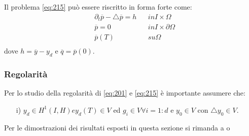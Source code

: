 Il problema \ref{eq:215} può essere riscritto in forma forte come:
\begin{equation}
\begin{aligned}
& {\partial_{t}}\overline{p} -\bigtriangleup\overline{p} = h & & in I{\times}\Omega \\
& \overline{p}=0 & & in I{\times}\partial\Omega \\
& \overline{p}(T) & & su \Omega \\
\label{eq:216}
\end{aligned}
\end{equation}
dove $ h= \overline{y} - y_d$ e $\overline{q}=\overline{p}(0)$.

\subsubsection{Regolarità}
Per lo studio della regolarità di \ref{eq:201} e \ref{eq:215} è importante assumere che:
\begin{itemize}
\item[i)] $y_d \in H^1(I,H) e y_d(T) \in V$ ed $g_i \in V {\forall}i=1:d$ e $y_0 \in V$ con ${\bigtriangleup}y_0 \in V$.
\end{itemize} 
Per le dimostrazioni dei risultati esposti in questa sezione si rimanda a \cite{MAIN} o \cite{MV11}